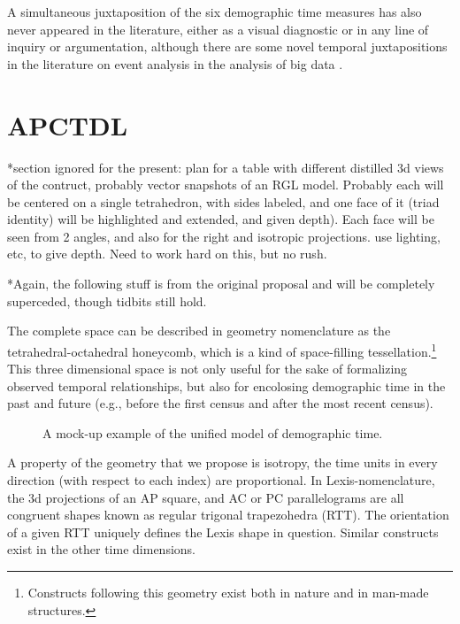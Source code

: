 \documentclass[11pt,oneside,a4paper]{article} %
\begin{document}
A simultaneous juxtaposition of the six demographic time measures has also never
appeared in the literature, either as a visual diagnostic or in any line of
inquiry or argumentation, although there are some novel temporal
juxtapositions in the literature on event analysis in the analysis of
big data \citep[see e.g.,]{watson2015timemaps}.

 \section*{APCTDL}
*section ignored for the present: plan for a table with different distilled 3d
views of the contruct, probably vector snapshots of an RGL model. Probably each
will be centered on a single tetrahedron, with sides labeled, and one face of
it (triad identity) will be highlighted and extended, and given depth). Each
face will be seen from 2 angles, and also for the right and isotropic
projections. use lighting, etc, to give depth. Need to work hard on this, but no
rush.

*Again, the following stuff is from the original proposal and will be completely
superceded, though tidbits still hold.

The complete space can be described in
geometry nomenclature as the tetrahedral-octahedral honeycomb, which is a kind of space-filling tessellation.\footnote{Constructs following
this geometry exist both in nature and in man-made structures.} 
 This three dimensional space is not only useful for the sake of formalizing observed temporal relationships, but also for encolosing
demographic time in the past and future (e.g., before the first census and after
the most recent census). 

\begin{figure}[!h]
\centering
\caption[cap]{A mock-up example of the unified model of demographic
time.\footnotemark}
\label{fig:APCT}
\end{figure}

A property of the geometry that we propose is isotropy,
the time units in every direction (with respect to each index) are proportional.
In Lexis-nomenclature, the 3d projections of an AP square, and AC or PC
parallelograms are all congruent shapes known as regular trigonal trapezohedra
(RTT). The orientation
of a given RTT uniquely defines the Lexis shape in question. Similar constructs
exist in the other time dimensions. 
\end{document}
